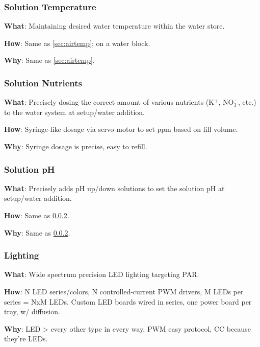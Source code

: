 \documentclass{report}
\begin{document}
\subsubsection{Solution Temperature}
\label{sec:watertemp}

\textbf{What}: Maintaining desired water temperature within the water store.

\textbf{How}: Same as \ref{sec:airtemp}; on a water block.

\textbf{Why}: Same as \ref{sec:airtemp}.

\subsubsection{Solution Nutrients}
\label{sec:nutrients}

\textbf{What}: Precisely dosing the correct amount of various nutrients (K${}^+$, NO${}_3^-$, etc.) to the water system at setup/water addition.


\textbf{How}: Syringe-like dosage via servo motor to set ppm based on fill volume.

\textbf{Why}: Syringe dosage is precise, easy to refill.

\subsubsection{Solution pH}
\label{sec:ph}

\textbf{What}: Precisely adds pH up/down solutions to set the solution pH at setup/water addition.

\textbf{How}: Same as \ref{sec:nutrients}.

\textbf{Why}: Same as \ref{sec:nutrients}.

\newpage

\subsubsection{Lighting}
\label{sec:lighting}

\textbf{What}: Wide spectrum precision LED lighting targeting PAR.

\textbf{How}: N LED series/colors, N controlled-current PWM drivers, M LEDs per series = NxM LEDs. Custom LED boards wired in series, one power board per tray, w/ diffusion.

\textbf{Why}: LED > every other type in every way, PWM easy protocol, CC because they’re LEDs.



% 
% 
\end{document}
